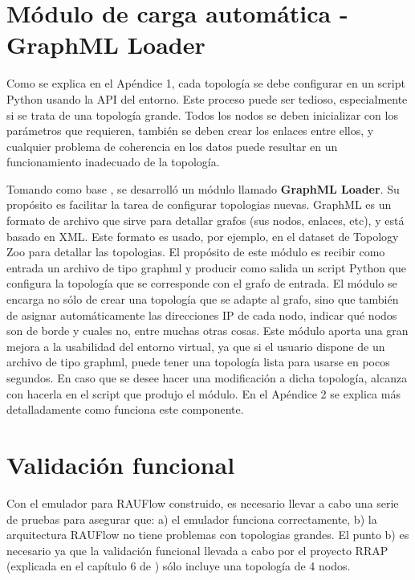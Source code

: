 \section{Módulo de carga automática - GraphML Loader}
Como se explica en el Apéndice 1, cada topología se debe configurar en un script Python usando la API del entorno. Este proceso puede ser tedioso, especialmente si se trata de una topología grande. Todos los nodos se deben inicializar con los parámetros que requieren, también se deben crear los enlaces entre ellos, y cualquier problema de coherencia en los datos puede resultar en un funcionamiento inadecuado de la topología.

Tomando como base \cite{auto-mininet}, se desarrolló un módulo llamado \textbf{GraphML Loader}. Su propósito es facilitar la tarea de configurar topologias nuevas. GraphML es un formato de archivo que sirve para detallar grafos (sus nodos, enlaces, etc), y está basado en XML. Este formato es usado, por ejemplo, en el dataset de Topology Zoo \cite{topology-zoo} para detallar las topologias. El propósito de este módulo es recibir como entrada un archivo de tipo graphml y producir como salida un script Python que configura la topología que se corresponde con el grafo de entrada. El módulo se encarga no sólo de crear una topología que se adapte al grafo, sino que también de asignar automáticamente las direcciones IP de cada nodo, indicar qué nodos son de borde y cuales no, entre muchas otras cosas. Este módulo aporta una gran mejora a la usabilidad del entorno virtual, ya que si el usuario dispone de un archivo de tipo graphml, puede tener una topología lista para usarse en pocos segundos. En caso que se desee hacer una modificación a dicha topología, alcanza con hacerla en el script que produjo el módulo. En el Apéndice 2 se explica más detalladamente como funciona este componente.

\section{Validación funcional}
Con el emulador para RAUFlow construido, es necesario llevar a cabo una serie de pruebas para asegurar que: a) el emulador funciona correctamente, b) la arquitectura RAUFlow no tiene problemas con topologias grandes. El punto b) es necesario ya que la validación funcional llevada a cabo por el proyecto RRAP (explicada en el capítulo 6 de \cite{proyecto-rrap}) sólo incluye una topología de 4 nodos.


